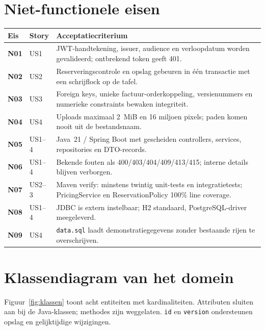 \documentclass[11pt]{article}
\begin{document}
\section{Niet-functionele eisen}
\begin{longtable}{@{}>{\bfseries}p{1.2cm}p{1.8cm}p{11cm}@{}}
\toprule
Eis & Story & Acceptatiecriterium \\
\midrule
\endhead
N01 & US1 & JWT-handtekening, issuer, audience en verloopdatum worden gevalideerd; ontbrekend token geeft 401. \\
N02 & US2 & Reserveringscontrole en opslag gebeuren in één transactie met een schrijflock op de tafel. \\
N03 & US3 & Foreign keys, unieke factuur-orderkoppeling, versienummers en numerieke constraints bewaken integriteit. \\
N04 & US4 & Uploads maximaal 2~MiB en 16 miljoen pixels; paden komen nooit uit de bestandsnaam. \\
N05 & US1--4 & Java~21 / Spring Boot met gescheiden controllers, services, repositories en DTO-records. \\
N06 & US1--4 & Bekende fouten als 400/403/404/409/413/415; interne details blijven verborgen. \\
N07 & US2--3 & Maven verify: minstens twintig unit-tests en integratietests; PricingService en ReservationPolicy 100\% line coverage. \\
N08 & US1--4 & JDBC is extern instelbaar; H2 standaard, PostgreSQL-driver meegeleverd. \\
N09 & US4 & \texttt{data.sql} laadt demonstratiegegevens zonder bestaande rijen te overschrijven. \\
\bottomrule
\end{longtable}

\section{Klassendiagram van het domein}
Figuur~\ref{fig:klassen} toont acht entiteiten met kardinaliteiten. Attributen
sluiten aan bij de Java-klassen; methodes zijn weggelaten. \texttt{id} en
\texttt{version} ondersteunen opslag en gelijktijdige wijzigingen.
\end{document}
